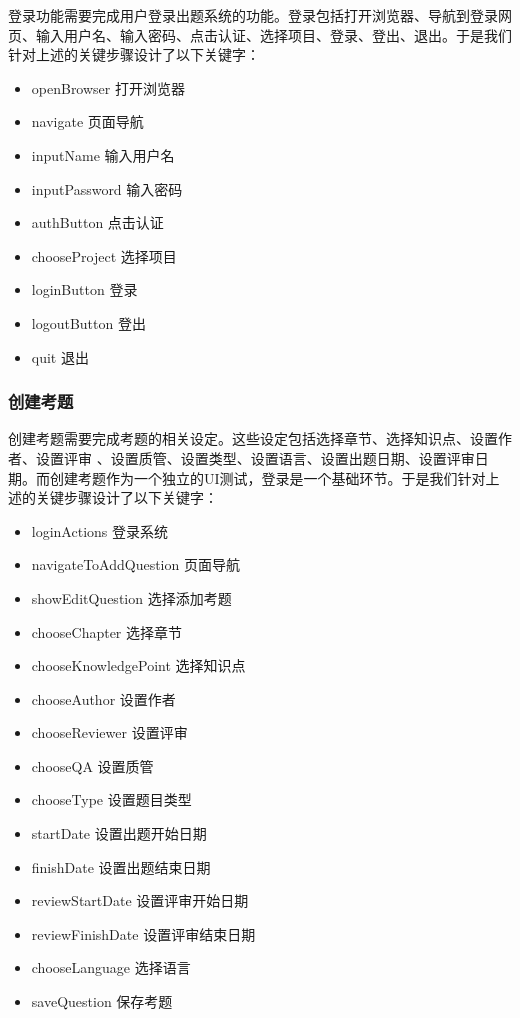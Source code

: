 \documentclass[hyperref, a4paper]{ctexart}
\providecommand{\tightlist}{%
  \setlength{\itemsep}{0pt}\setlength{\parskip}{0pt}}
\begin{document}
登录功能需要完成用户登录出题系统的功能。登录包括打开浏览器、导航到登录网页、输入用户名、输入密码、点击认证、选择项目、登录、登出、退出。于是我们针对上述的关键步骤设计了以下关键字：

\begin{itemize}
\tightlist
\item
  openBrowser 打开浏览器
\item
  navigate 页面导航
\item
  inputName 输入用户名
\item
  inputPassword 输入密码
\item
  authButton 点击认证
\item
  chooseProject 选择项目
\item
  loginButton 登录
\item
  logoutButton 登出
\item
  quit 退出
\end{itemize}

\hypertarget{ux521bux5efaux8003ux9898}{%
\subsubsection{创建考题}\label{ux521bux5efaux8003ux9898}}

创建考题需要完成考题的相关设定。这些设定包括选择章节、选择知识点、设置作者、设置评审
、设置质管、设置类型、设置语言、设置出题日期、设置评审日期。而创建考题作为一个独立的UI测试，登录是一个基础环节。于是我们针对上述的关键步骤设计了以下关键字：

\begin{itemize}
\tightlist
\item
  loginActions 登录系统
\item
  navigateToAddQuestion 页面导航
\item
  showEditQuestion 选择添加考题
\item
  chooseChapter 选择章节
\item
  chooseKnowledgePoint 选择知识点
\item
  chooseAuthor 设置作者
\item
  chooseReviewer 设置评审
\item
  chooseQA 设置质管
\item
  chooseType 设置题目类型
\item
  startDate 设置出题开始日期
\item
  finishDate 设置出题结束日期
\item
  reviewStartDate 设置评审开始日期
\item
  reviewFinishDate 设置评审结束日期
\item
  chooseLanguage 选择语言
\item
  saveQuestion 保存考题
\end{itemize}
\end{document}
